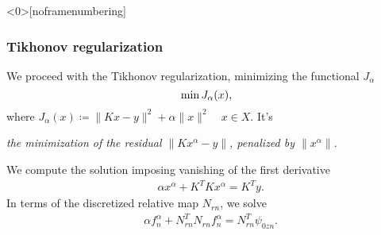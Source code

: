 \documentclass[10pt,xcolor={dvipsnames}]{beamer}
\theoremstyle{plain}
\theoremstyle{plain}
\begin{document}
\begin{frame}<0>[noframenumbering]
 \frametitle{Tikhonov regularization}
We proceed with the {\color{blue}Tikhonov regularization}, minimizing the functional $J_\alpha$
 \begin{equation}
  \textup{min}\,J_\alpha(x),
 \end{equation}
where $J_\alpha(x)\coloneqq\|Kx - y\|^2 + \alpha\|x\|^2\quad x\in X$. It's
\begin{center}
\emph{
the minimization of the residual $\|Kx^{\alpha} - y\|$,
penalized by 
$\|x^\alpha\|$.
}
\end{center}
We compute the solution imposing vanishing of the first derivative
\begin{align}
 &\alpha x^{\alpha} + K^TKx^{\alpha} = K^Ty.
\end{align}
In terms of the discretized relative map $N_{rn}$, we solve
\begin{align}
 &\alpha f_n^{\alpha} + N_{rn}^TN_{rn}f_n^{\alpha} = N_{rn}^T\psi_{0zn}\label{eq:tikh-reg-lsm-discrete}.
\end{align}

\end{frame}
\end{document}
